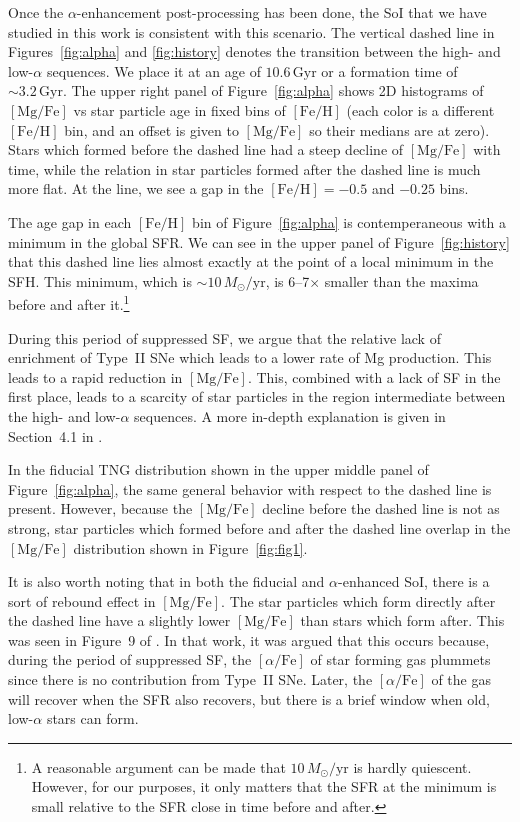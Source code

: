 \documentclass[linenumbers, twocolumn]{aastex631}
\newcommand{\Msun}{\ensuremath{M_{\odot}}}
\newcommand{\Gyr}{\ensuremath{\textrm{Gyr}}}
\newcommand{\FeH}{\ensuremath{[\textrm{Fe}/\textrm{H}]}}
\newcommand{\MgFe}{\ensuremath{[\textrm{Mg}/\textrm{Fe}]}}
\newcommand{\alphaFe}{\ensuremath{[\alpha/\textrm{Fe}]}}
\newcommand{\Msunyr}{\ensuremath{\Msun/\textrm{yr}}}
\begin{document}
Once the $\alpha$-enhancement post-processing has been done, the SoI that we have studied in this work is consistent with this scenario. The vertical dashed line in Figures~\ref{fig:alpha} and \ref{fig:history} denotes the transition between the high- and low-$\alpha$ sequences. We place it at an age of $10.6\,\Gyr$ or a formation time of $\sim3.2\,\Gyr$. The upper right panel of Figure~\ref{fig:alpha} shows 2D histograms of \MgFe{} vs star particle age in fixed bins of \FeH{} (each color is a different \FeH{} bin, and an offset is given to \MgFe{} so their medians are at zero). Stars which formed before the dashed line had a steep decline of \MgFe{} with time, while the relation in star particles formed after the dashed line is much more flat. At the line, we see a gap in the $\FeH=-0.5$ and $-0.25$ bins.

The age gap in each \FeH{} bin of Figure~\ref{fig:alpha} is contemperaneous with a minimum in the global SFR. We can see in the upper panel of Figure~\ref{fig:history} that this dashed line lies almost exactly at the point of a local minimum in the SFH. This minimum, which is $\sim10\,\Msunyr$, is 6--7$\times$ smaller than the maxima before and after it.\footnote{A reasonable argument can be made that $10\,\Msunyr$ is hardly quiescent. However, for our purposes, it only matters that the SFR at the minimum is small relative to the SFR close in time before and after.}

During this period of suppressed SF, we argue that the relative lack of enrichment of Type~II SNe which leads to a lower rate of Mg production. This leads to a rapid reduction in \MgFe{}. This, combined with a lack of SF in the first place, leads to a scarcity of star particles in the region intermediate between the high- and low-$\alpha$ sequences. A more in-depth explanation is given in Section~4.1 in \citet{2024arXiv240707985B}. 

In the fiducial TNG distribution shown in the upper middle panel of Figure~\ref{fig:alpha}, the same general behavior with respect to the dashed line is present. However, because the \MgFe{} decline before the dashed line is not as strong, star particles which formed before and after the dashed line overlap in the \MgFe{} distribution shown in Figure~\ref{fig:fig1}. 

It is also worth noting that in both the fiducial and $\alpha$-enhanced SoI, there is a sort of rebound effect in \MgFe{}. The star particles which form directly after the dashed line have a slightly lower \MgFe{} than stars which form after. This was seen in Figure~9 of \citet{2024arXiv240707985B}. In that work, it was argued that this occurs because, during the period of suppressed SF, the \alphaFe{} of star forming gas plummets since there is no contribution from Type~II SNe. Later, the \alphaFe{} of the gas will recover when the SFR also recovers, but there is a brief window when old, low-$\alpha$ stars can form.
\end{document}
